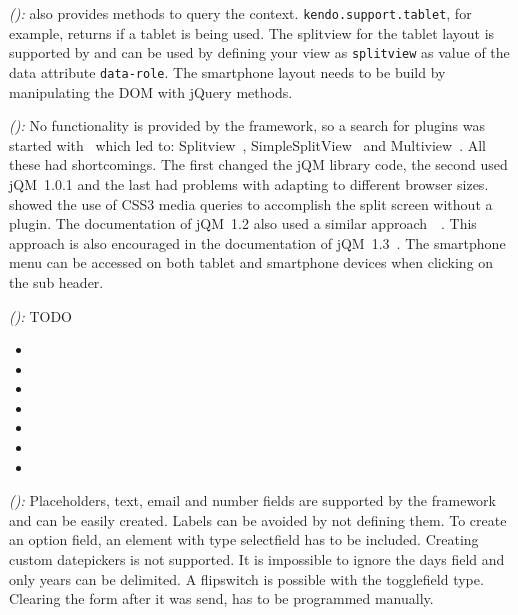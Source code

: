 \documentclass[a4paper]{artikel3}
\newcommand{\code}[1]{\texttt{#1}}
\newcommand{\setspace}[0]{\vspace{2mm}}
\renewcommand{\paragraph}[1]{\setspace \noindent {\bf #1}  }
\newcommand{\framework}[2]{ \emph{#1 (\textbf{#2}): }} %
\newcommand{\challenge}[1]{\paragraph{#1}}
\begin{document}
\framework{\kendoa{}}{}
\kendo{} also provides methods to query the context.
\code{kendo.support.tablet},  for example,  returns if a tablet is being used.
The splitview for the tablet layout is supported by \kendo{} and can be used by defining your view as \code{splitview} as value of the data attribute \code{data-role}.
The smartphone layout needs to be build by manipulating the DOM with jQuery methods.

\framework{\jqma{}}{}
No functionality is provided by the framework, so a search for plugins was started with~\cite{Deering2012} which led to: Splitview~\cite{Rahman2013}, SimpleSplitView~\cite{Yared2013} and Multiview~\cite{Franck2012}. 
All these had shortcomings. 
The first changed the jQM library code, the second used jQM~1.0.1 and the last had problems with adapting to different browser sizes.
\cite{Hadlock2012} showed the use of CSS3 media queries to accomplish the split screen without a plugin.
The documentation of jQM~1.2 also used a similar approach~~\cite{JQuery2012b}.
This approach is also encouraged in the documentation of jQM~1.3~\cite{JQuery2013e}.
The smartphone menu can be accessed on both tablet and smartphone devices when clicking on the sub header.

\framework{\lungoa{}}{}
TODO


\challenge{\chal{formulieren}}

\begin{itemize}
 \item {}
 \item {}
 \item {}
 \item {}
 \item {}
 \item {}
 \item {}
\end{itemize}


\framework{\sta{}}{}
Placeholders, text, email and number fields are supported by the framework and can be easily created.  
Labels can be avoided by not defining them.  
To create an option field, an element with type selectfield has to be included.
Creating custom datepickers is not supported.  
It is impossible to ignore the days field and only years can be delimited.  
A flipswitch is possible with the togglefield type.
Clearing the form after it was send, has to be programmed manually.
\end{document}
